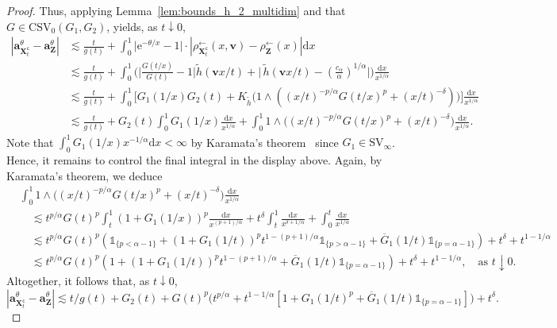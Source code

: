 \documentclass[en,oneside,bbfont,article]{amsart}
\theoremstyle{remark}
\theoremstyle{definition}
\theoremstyle{definition}
\newcommand\e{\mathord{\mathrm{e}}}
\newcommand\1{\mathds{1}}
\newcommand\SV{\mathrm{SV}}
\newcommand\CSV{\mathrm{CSV}}
\newcommand\da{\downarrow}
\newcommand\la{\leftarrow}
\newcommand\co{\mathsf{c}}
\newcommand{\D}{\mathrm{d}}
\newcommand{\ov}[1]{\overline{#1}}
\newcommand{\wt}[1]{\widetilde{#1}}
\begin{document}
\begin{proof}
Thus, applying Lemma~\ref{lem:bounds_h_2_multidim} and that $G \in \CSV_0(G_1,G_2)$, yields, as $t\da 0$,
\begin{align*}%
|\bm{a}_{\bm{X}_t^\co}^\theta-\bm{a}_{\bm{Z}}^\theta| &\lesssim \frac{t}{g(t)} + \int _0^1 \big|\e^{-\theta/x}-1\big|\cdot |\rho^{\la}_{\bm{X}_t^\co}(x,\bm{v})-\rho^{\la}_{\bm{Z}}(x)| \D x\\
&\lesssim \frac{t}{g(t)} + \int _0^1 \bigg(\bigg|\frac{G(t/x)}{G(t)}-1\bigg|\wt h(\bm{v} x/t)
+\bigg|\,\wt h(\bm{v} x/t)-\left(\frac{c_\alpha}{\alpha}\right)^{1/\alpha}\bigg| \bigg)
\frac{\D x}{x^{1/\alpha}}\\
&\lesssim \frac{t}{g(t)} 
+ \int _0^1 \big[G_1(1/x)G_2(t)
+K_{\wt h}\big(1\wedge ((x/t)^{-p/\alpha}G(t/x)^p+(x/t)^{-\delta})\big) \big]\frac{\D x}{x^{1/\alpha}} \\
&\lesssim \frac{t}{g(t)} + G_2(t) \int _0^1 G_1(1/x) \frac{\D x}{x^{1/\alpha}}
+ \int_0^1 1\wedge \big((x/t)^{-p/\alpha}G(t/x)^p+(x/t)^{-\delta}\big) \frac{\D x}{x^{1/\alpha}}.
\end{align*} 
Note that $\int _0^1 G_1(1/x) x^{-1/\alpha}\D x<\infty$ by Karamata's theorem~\cite[Thm~1.5.11]{MR1015093} since $G_1 \in \SV_\infty$. Hence, it remains to control the final integral in the display above. Again, by Karamata's theorem, we deduce 
\begin{align*}
&\int_0^1 1\wedge \big((x/t)^{-p/\alpha}G(t/x)^p+(x/t)^{-\delta}\big) \frac{\D x}{x^{1/\alpha}}\\ 
&\quad\lesssim t^{p/\alpha} G(t)^p \int_t^1(1+G_1(1/x))^p \frac{\D x}{x^{(p+1)/\alpha}} + t^{\delta}\int_t^1 \frac{\D x}{x^{\delta+1/\alpha}}+ \int_0^t \frac{\D x}{x^{1/\alpha}} \\
& \quad\lesssim t^{p/\alpha}G(t)^p(\1_{\{p< \alpha-1\}}+(1+G_1(1/t))^p t^{1-(p+1)/\alpha}\1_{\{p>\alpha-1\}}+\ov{G}_1(1/t)\1_{\{p=\alpha-1\}}) +t^{\delta}+t^{1-1/\alpha}\\
&\quad\lesssim t^{p/\alpha}G(t)^p(1+(1+G_1(1/t))^p t^{1-(p+1)/\alpha}+\ov{G}_1(1/t)\1_{\{p=\alpha-1\}}) +t^{\delta}+t^{1-1/\alpha}, 
\quad \text{as } t \da 0.
\end{align*}
Altogether, it follows that, as $t\da 0$,
\begin{equation*}
|\bm{a}_{\bm{X}_t^\co}^\theta-\bm{a}_{\bm{Z}}^\theta| 
\lesssim t/g(t)+G_2(t)
+G(t)^p\big(t^{p/\alpha}+t^{1-1/\alpha}[1+G_1(1/t)^p +\ov{G}_1(1/t)\1_{\{p=\alpha-1\}}]\big) +t^{\delta}.
\end{equation*}


\end{proof}
\end{document}
